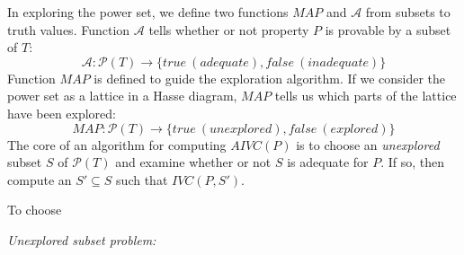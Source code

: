 In exploring the power set, 
we define two functions $MAP$ and $\mathcal{A}$
from subsets to truth values. 
Function $\mathcal{A}$ tells whether or not property $P$ is provable by a subset of $T$:
$$\mathcal{A} : \mathcal{P}(T) \rightarrow \{true~(adequate), false~(inadequate)\}$$  
\noindent Function $MAP$ is defined to guide the exploration algorithm. 
If we consider the power set as a lattice in a Hasse diagram, 
$MAP$ tells us which parts of the lattice have been explored:
$$MAP: \mathcal{P}(T) \rightarrow \{true~(unexplored), false~(explored)\}$$
\noindent The core of an algorithm for computing $AIVC(P)$ is to choose an \emph{unexplored} subset $S$ of $\mathcal{P}(T)$ and examine whether or not $S$ is adequate for $P$. If so, then compute an $S' \subseteq S$ such that $IVC(P, S')$.

To choose 

\begin{definition}{\emph{Unexplored subset problem:}}
  \label{def:usp}
  
\end{definition}





 

 

